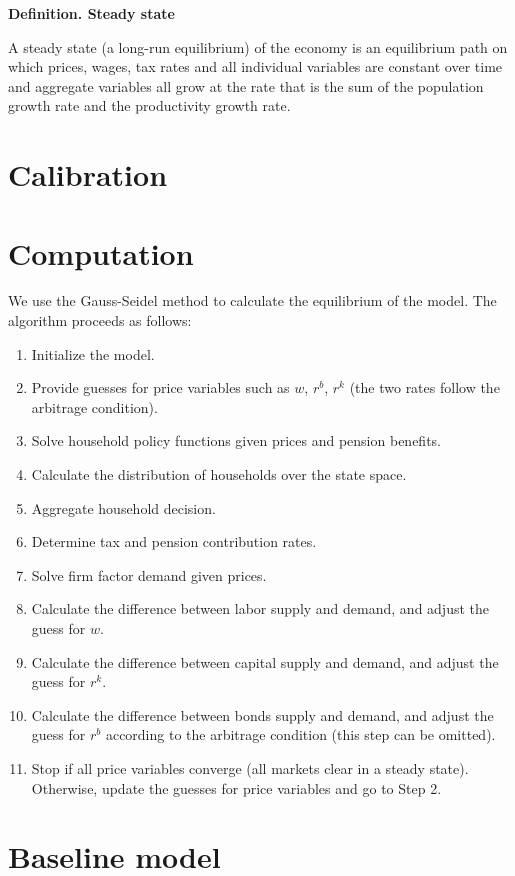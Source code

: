 \documentclass[12pt]{article}
\begin{document}
\textbf{Definition. Steady state} 

A steady state (a long-run equilibrium) of the economy is an equilibrium path on which prices, wages, tax rates and all individual variables are constant over time and aggregate variables all grow at the rate that is the sum of the population growth rate and the productivity growth rate. 

\section{Calibration}
\section{Computation}

We use the Gauss-Seidel method to calculate the equilibrium of the model. The algorithm proceeds as follows:
\begin{enumerate}
	\item Initialize the model.
	\item Provide guesses for price variables such as $w$, $r^b$, $r^k$ (the two rates follow the arbitrage condition).
	\item Solve household policy functions given prices and pension benefits.
	\item Calculate the distribution of households over the state space. 
	\item Aggregate household decision.
	\item Determine tax and pension contribution rates.
	\item Solve firm factor demand given prices. 
	\item Calculate the difference between labor supply and demand, and adjust the guess for $w$.
	\item Calculate the difference between capital supply and demand, and adjust the guess for $r^k$.
	\item Calculate the difference between bonds supply and demand, and adjust the guess for $r^b$ according to the arbitrage condition (this step can be omitted).
	\item Stop if all price variables converge (all markets clear in a steady state). Otherwise, update the guesses for price variables and go to Step 2. 
\end{enumerate}


\section{Baseline model}
\end{document}

